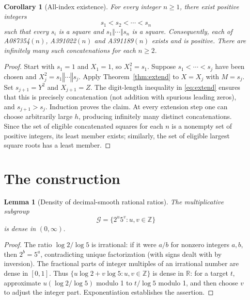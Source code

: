 \documentclass[9pt]{extarticle}
\newtheorem{lemma}{Lemma}
\newtheorem{corollary}{Corollary}
\newcommand{\cat}{\mathbin{\Vert}}
\begin{document}
\begin{corollary}[All-index existence]\label{cor:oeis}
For every integer $n\ge1$, there exist positive integers
\[s_1<s_2<\cdots<s_n\]
such that every $s_i$ is a square and
$s_1\cat\cdots\cat s_n$ is a square. Consequently, each of
A087354$(n)$, A391022$(n)$ and A391189$(n)$ exists and is positive.
There are infinitely many such concatenations for each $n\ge2$.
\end{corollary}
\begin{proof}
Start with $s_1=1$ and $X_1=1$, so $X_1^2=s_1$.
Suppose $s_1<\cdots<s_j$ have been chosen and
$X_j^2=s_1\cat\cdots\cat s_j$. Apply
Theorem~\ref{thm:extend} to $X=X_j$ with $M=s_j$.
Set $s_{j+1}=Y^2$ and $X_{j+1}=Z$. The digit-length
inequality in \eqref{eq:extend} ensures that this is precisely
concatenation (not addition with spurious leading zeros), and
$s_{j+1}>s_j$. Induction proves the claim.
At every extension step one can choose arbitrarily large $h$,
producing infinitely many distinct concatenations. Since the set of
eligible concatenated squares for each $n$ is a nonempty set of
positive integers, its least member exists; similarly, the set
of eligible largest square roots has a least member.
\end{proof}

\section{The construction}
\begin{lemma}[Density of decimal-smooth rational ratios]\label{lem:dense}
The multiplicative subgroup
\[\mathcal G=\{2^u5^v:u,v\in\mathbb Z\}\]
is dense in $(0,\infty)$.
\end{lemma}
\begin{proof}
The ratio $\log 2/\log 5$ is irrational: if it were $a/b$
for nonzero integers $a,b$, then $2^b=5^a$, contradicting
unique factorization (with signs dealt with by inversion).
The fractional parts of integer multiples of an irrational number
are dense in $[0,1]$. Thus
$\{u\log2+v\log5:u,v\in\mathbb Z\}$
is dense in $\mathbb R$: for a target $t$, approximate
$u(\log2/\log5)$ modulo 1 to $t/\log5$ modulo 1,
and then choose $v$ to adjust the integer part.
Exponentiation establishes the assertion.
\end{proof}
\end{document}
